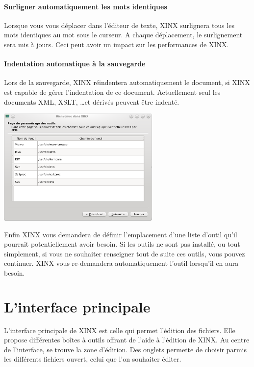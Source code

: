 \documentclass[a4paper,10pt,twoside]{book}
\begin{document}
\paragraph{Surligner automatiquement les mots identiques} Lorsque vous vous déplacer dans l'éditeur de texte, XINX surlignera tous les mots identiques au mot sous le curseur. A chaque déplacement, le surlignement sera mis à jours. Ceci peut avoir un impact sur les performances de XINX.

\paragraph{Indentation automatique à la sauvegarde} Lors de la sauvegarde, XINX réindentera automatiquement le document, si XINX est capable de gérer l'indentation de ce document. Actuellement seul les documents XML, XSLT, \dots et dérivés peuvent être indenté.

\begin{center}
 \includegraphics[width=0.60\textwidth]{./firstinstall4.png}
\end{center}

Enfin XINX vous demandera de définir l'emplacement d'une liste d'outil qu'il pourrait potentiellement avoir besoin. Si les outils ne sont pas installé, ou tout simplement, si vous ne souhaiter renseigner tout de suite ces outils, vous pouvez continuer. XINX vous re-demandera automatiquement l'outil lorsqu'il en aura besoin.

\section{L'interface principale}

L'interface principale de XINX est celle qui permet l'édition des fichiers. Elle propose différentes boîtes à outils offrant de l'aide à l'édition de XINX. Au centre de l'interface, se trouve la zone d'édition. Des onglets permette de choisir parmis les différents fichiers ouvert, celui que l'on souhaiter éditer.
\end{document}
